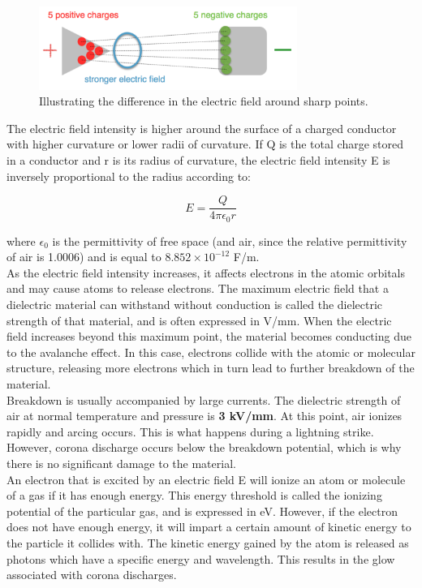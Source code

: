 \documentclass[11pt]{article}
\begin{document}
\begin{figure}[h!]
\centering
\includegraphics[width= 0.75\textwidth]{corona_1}
\caption{\label{fig:corona_1} Illustrating the difference in the electric field around sharp points. \cite{workshop}}
\end{figure}

The electric field intensity is higher around the surface of a charged conductor with higher curvature or lower radii of curvature. If Q is the total charge stored in a conductor and r is its radius of curvature, the electric field intensity E is inversely proportional to the radius according to:

\begin{equation}
E = \frac{Q}{4 \pi \epsilon_0 r}
\end{equation}


where $\epsilon_0$ is the permittivity of free space (and air, since the relative permittivity of air is 1.0006) and is equal to $8.852 \times 10^{-12}$ F/m.\\

As the electric field intensity increases, it affects electrons in the atomic orbitals and may cause atoms to release electrons. The maximum electric field that a dielectric material can withstand without conduction is called the dielectric strength of that material, and is often expressed in V/mm. When the electric field increases beyond this maximum point, the material becomes conducting due to the avalanche effect. In this case, electrons collide with the atomic or molecular structure, releasing more electrons which in turn lead to further breakdown of the material.\\

Breakdown is usually accompanied by large currents. The dielectric strength of air at normal temperature and pressure is \textbf{3 kV/mm}. At this point, air ionizes rapidly and arcing occurs. This is what happens during a lightning strike. However, corona discharge occurs below the breakdown potential, which is why there is no significant damage to the material.\\


An electron that is excited by an electric field E will ionize an atom or molecule of a gas if it has enough energy. This energy threshold is called the ionizing potential of the particular gas, and is expressed in eV. However, if the electron does not have enough energy, it will impart a certain amount of kinetic energy to the particle it collides with. The kinetic energy gained by the atom is released as photons which have a specific energy and wavelength. This results in the glow associated with corona discharges.\\
\end{document}
